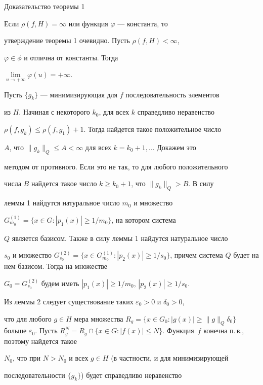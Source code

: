 \begin{pf*}{Доказательство теоремы 1} 


Если $\rho(f,H)=\infty$ или функция $\varphi$ --- константа, то 


утверждение теоремы 1 очевидно. Пусть $\rho(f,H)<\infty$, 


$\varphi\in\phi$ и отлична от константы. Тогда 


$\lim\limits_{u\to+\infty}\varphi(u)=+\infty$. 


 


Пусть $\{g_k\}$ --- минимизирующая для $f$ последовательность элементов 


из $H$. Начиная с некоторого $k_0$, для всех $k$ справедливо неравенство 


$\rho(f,g_k)\le\rho(f,g_1)+1$. Тогда найдется такое положительное число 


$A$, что $\|g_k\|_Q\le A<\infty$ для всех $k=k_0+1,\dotsc$ Докажем это 


методом от противного. Если это не так, то для любого положительного 


числа $B$ найдется такое число $k\ge k_0+1$, что $\|g_k\|_Q>B$. В силу 


леммы 1 найдутся натуральное число $m_0$ и множество 


$G^{(1)}_{m_0}=\{x\in G:|p_1(x)|\ge 1/m_0\}$, на котором система 


$Q$ является базисом. Также в силу леммы 1 найдутся натуральное число 


$s_0$ и множество $G^{(2)}_{s_0}=\{x\in G^{(1)}_{m_0}:|p_2(x)|\ge 


1/s_0\}$, причем система $Q$ будет на нем базисом. Тогда на множестве 


$G_0=G^{(2)}_{s_0}$ будем иметь $|p_1(x)|\ge 1/m_0$, $|p_2(x)|\ge 1/s_0$. 


Из леммы 2 следует существование таких $\varepsilon_0>0$ и $\delta_0>0$, 


что для любого $g\in H$ мера множества $R_g=\{x\in G_0:|g(x)|\ge 


\|g\|_Q\delta_0\}$ больше $\varepsilon_0$. Пусть $R^N_g=R_g\cap \{x\in 


G:|f(x)|\le N\}$. Функция~$f$ конечна п.\,в., поэтому найдется такое 


$N_0$, что при $N>N_0$ и всех $g\in H$ (в частности, и для минимизирующей 


последовательности $\{g_k\}$) будет справедливо неравенство 



\end{pf*}
